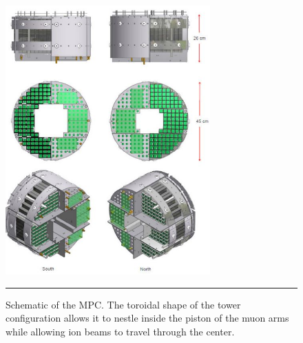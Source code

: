 \begin{figure}[h!]
  \centering
    \includegraphics[width=0.7\textwidth]{Figures/mpcschematic.JPG}
    \rule{35em}{0.5pt}
  \caption[Schematic of the MPC]{Schematic of the MPC. The toroidal shape of the tower configuration allows it to nestle inside the piston of the muon arms while allowing ion beams to travel through the center.}
  \label{fig:mpcschematic}
\end{figure}

